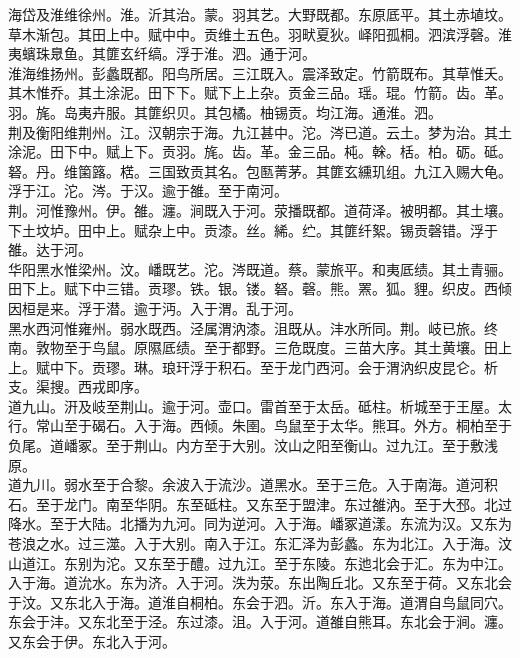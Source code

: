 \documentclass{zhvt-classic}
\begin{document}
\hspace*{2em}海岱及淮维徐州。淮。沂其治。蒙。羽其艺。大野既都。东原厎平。其土赤埴坟。草木渐包。其田上中。赋中中。贡维土五色。羽畎夏狄。峄阳孤桐。泗滨浮磬。淮夷蠙珠臮鱼。其篚玄纤缟。浮于淮。泗。通于河。\\
\hspace*{2em}淮海维扬州。彭蠡既都。阳鸟所居。三江既入。震泽致定。竹箭既布。其草惟夭。其木惟乔。其土涂泥。田下下。赋下上上杂。贡金三品。瑶。琨。竹箭。齿。革。羽。旄。岛夷卉服。其篚织贝。其包橘。柚锡贡。均江海。通淮。泗。\\
\hspace*{2em}荆及衡阳维荆州。江。汉朝宗于海。九江甚中。沱。涔已道。云土。梦为治。其土涂泥。田下中。赋上下。贡羽。旄。齿。革。金三品。杶。榦。栝。柏。砺。砥。砮。丹。维箘簬。楛。三国致贡其名。包匦菁茅。其篚玄纁玑组。九江入赐大龟。浮于江。沱。涔。于汉。逾于雒。至于南河。\\
\hspace*{2em}荆。河惟豫州。伊。雒。瀍。涧既入于河。荥播既都。道荷泽。被明都。其土壤。下土坟垆。田中上。赋杂上中。贡漆。丝。絺。纻。其篚纤絮。锡贡磬错。浮于雒。达于河。\\
\hspace*{2em}华阳黑水惟梁州。汶。嶓既艺。沱。涔既道。蔡。蒙旅平。和夷厎绩。其土青骊。田下上。赋下中三错。贡璆。铁。银。镂。砮。磬。熊。罴。狐。貍。织皮。西倾因桓是来。浮于潜。逾于沔。入于渭。乱于河。\\
\hspace*{2em}黑水西河惟雍州。弱水既西。泾属渭汭漆。沮既从。沣水所同。荆。岐已旅。终南。敦物至于鸟鼠。原隰厎绩。至于都野。三危既度。三苗大序。其土黄壤。田上上。赋中下。贡璆。琳。琅玕浮于积石。至于龙门西河。会于渭汭织皮昆仑。析支。渠搜。西戎即序。\\
\hspace*{2em}道九山。汧及岐至荆山。逾于河。壶口。雷首至于太岳。砥柱。析城至于王屋。太行。常山至于碣石。入于海。西倾。朱圉。鸟鼠至于太华。熊耳。外方。桐柏至于负尾。道嶓冢。至于荆山。内方至于大别。汶山之阳至衡山。过九江。至于敷浅原。\\
\hspace*{2em}道九川。弱水至于合黎。余波入于流沙。道黑水。至于三危。入于南海。道河积石。至于龙门。南至华阴。东至砥柱。又东至于盟津。东过雒汭。至于大邳。北过降水。至于大陆。北播为九河。同为逆河。入于海。嶓冢道漾。东流为汉。又东为苍浪之水。过三澨。入于大别。南入于江。东汇泽为彭蠡。东为北江。入于海。汶山道江。东别为沱。又东至于醴。过九江。至于东陵。东迆北会于汇。东为中江。入于海。道沇水。东为济。入于河。泆为荥。东出陶丘北。又东至于荷。又东北会于汶。又东北入于海。道淮自桐柏。东会于泗。沂。东入于海。道渭自鸟鼠同穴。东会于沣。又东北至于泾。东过漆。沮。入于河。道雒自熊耳。东北会于涧。瀍。又东会于伊。东北入于河。\\
\end{document}
